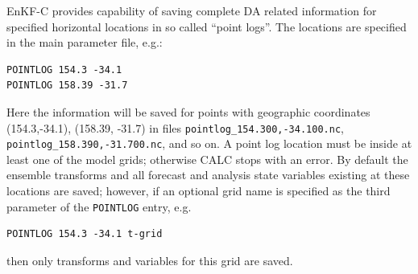 \documentclass[11pt]{report}
\begin{document}
EnKF-C provides capability of saving complete DA related information for specified horizontal locations in so called ``point logs''.
The locations are specified in the main parameter file, e.g.:
\begin{Verbatim}
POINTLOG 154.3 -34.1
POINTLOG 158.39 -31.7
\end{Verbatim}
Here the information will be saved for points with geographic coordinates (154.3,-34.1), (158.39, -31.7) in files \verb|pointlog_154.300,-34.100.nc|, \verb|pointlog_158.390,-31.700.nc|, and so on.
A point log location must be inside at least one of the model grids; otherwise CALC stops with an error.
By default the ensemble transforms and all forecast and analysis state variables existing at these locations are saved; however, if an optional grid name is specified as the third parameter of the \verb|POINTLOG| entry, e.g.
\begin{Verbatim}
POINTLOG 154.3 -34.1 t-grid
\end{Verbatim}
then only transforms and variables for this grid are saved.
\end{document}
